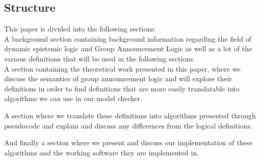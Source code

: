 \subsection{Structure}

This paper is divided into the following sections: \\

A background section containing background information regarding the field of dynamic epistemic logic and Group Announcement Logic as well as a lot of the various definitions that will be used in the following sections. \\

A section containing the theoretical work presented in this paper, where we discuss the semantics of group announcement logic and will explore their definitions in order to find definitions that are more easily translatable into algorithms we can use in our model checker.

A section where we translate these definitions into algorithms presented through pseudocode and explain and discuss any differences from the logical definitions.

And finally a section where we present and discuss our implementation of these algorithms and the working software they are implemented in.

